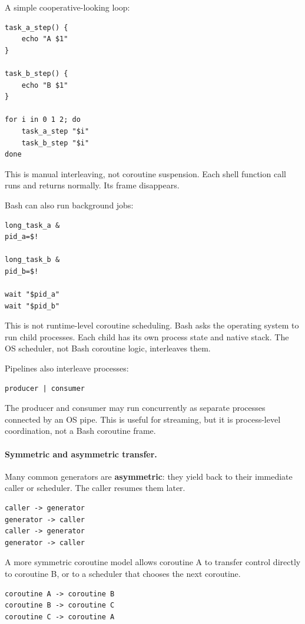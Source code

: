 A simple cooperative-looking loop:

\begin{verbatim}
task_a_step() {
    echo "A $1"
}

task_b_step() {
    echo "B $1"
}

for i in 0 1 2; do
    task_a_step "$i"
    task_b_step "$i"
done
\end{verbatim}

This is manual interleaving, not coroutine suspension. Each shell function call runs and returns normally. Its frame disappears.

Bash can also run background jobs:

\begin{verbatim}
long_task_a &
pid_a=$!

long_task_b &
pid_b=$!

wait "$pid_a"
wait "$pid_b"
\end{verbatim}

This is not runtime-level coroutine scheduling. Bash asks the operating system to run child processes. Each child has its own process state and native stack. The OS scheduler, not Bash coroutine logic, interleaves them.

Pipelines also interleave processes:

\begin{verbatim}
producer | consumer
\end{verbatim}

The producer and consumer may run concurrently as separate processes connected by an OS pipe. This is useful for streaming, but it is process-level coordination, not a Bash coroutine frame.

\paragraph{Symmetric and asymmetric transfer.}

Many common generators are \textbf{asymmetric}: they yield back to their immediate caller or scheduler. The caller resumes them later.

\begin{verbatim}
caller -> generator
generator -> caller
caller -> generator
generator -> caller
\end{verbatim}

A more symmetric coroutine model allows coroutine A to transfer control directly to coroutine B, or to a scheduler that chooses the next coroutine.

\begin{verbatim}
coroutine A -> coroutine B
coroutine B -> coroutine C
coroutine C -> coroutine A
\end{verbatim}

